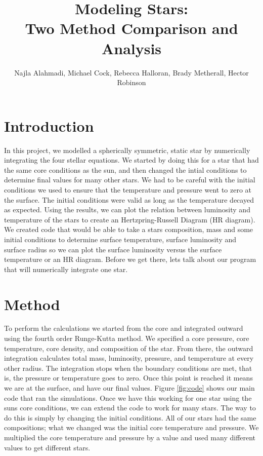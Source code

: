 \documentclass[10pt]{article}
\title{Modeling Stars: \\ Two Method Comparison and Analysis}
\author{Najla Alahmadi, Michael Cock, Rebecca Halloran, Brady Metherall, Hector Robinson}
\begin{document}
\maketitle

\lstset{style=mystyle}
\section{Introduction}
In this project, we modelled a spherically symmetric, static star by numerically integrating the four stellar equations. We started by doing this for a star that had the same core conditions as the sun, and then changed the intial conditions to determine final values for many other stars. We had to be careful with the initial conditions we used to ensure that the temperature and pressure went to zero at the surface. The initial conditions were valid as long as the temperature decayed as expected. Using the results, we can plot the relation between luminosity and temperature of the stars to create an Hertzpring-Russell Diagram (HR diagram). We created code that would be able to take a stars composition, mass and some initial conditions to determine surface temperature, surface luminosity and surface radius so we can plot the surface luminosity versus the surface temperature or an HR diagram. Before we get there, lets talk about our program that will numerically integrate one star. \\

\section{Method}
To perform the calculations we started from the core and integrated outward using the fourth order Runge-Kutta method. We specified a core pressure, core temperature, core density, and composition of the star. From there, the outward integration calculates total mass, luminosity, pressure, and temperature at every other radius. The integration stops when the boundary conditions are met, that is, the pressure or temperature goes to zero. Once this point is reached it means we are at the surface, and have our final values. Figure \ref{fig:code} shows our main code that ran the simulations. Once we have this working for one star using the suns core conditions, we can extend the code to work for many stars. The way to do this is simply by changing the initial conditions. All of our stars had the same compositions; what we changed was the initial core temperature and pressure. We multiplied the core temperature and pressure by a value and used many different values to get different stars.\\
\end{document}

